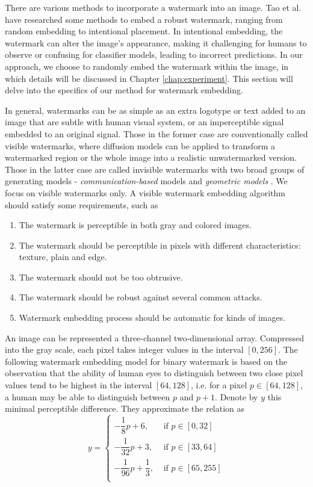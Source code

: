 There are various methods to incorporate a watermark into an image. Tao et al. \cite{tao2014robust} have researched some methods to embed a robust watermark, ranging from random embedding to intentional placement. In intentional embedding, the watermark can alter the image's appearance, making it challenging for humans to observe or confusing for classifier models, leading to incorrect predictions. In our approach, we choose to randomly embed the watermark within the image, in which details will be discussed in Chapter \ref{chap:experiment}. This section will delve into the specifics of our method for watermark embedding.


In general, watermarks can be as simple as an extra logotype or text added to an image that are subtle with human visual system, or an imperceptible signal embedded to an original signal. Those in the former case are conventionally called visible watermarks, where diffusion models can be applied to transform a watermarked region or the whole image into a realistic unwatermarked version. Those in the latter case are called invisible watermarks with two broad groups of generating models - \textit{communication-based} models and \textit{geometric models} \cite{cox2007digital}. We focus on visible watermarks only. A visible watermark embedding algorithm should satisfy some requirements, such as

\begin{enumerate}
    \item The watermark is perceptible in both gray and colored images.
    \item The watermark should be perceptible in pixels with different characteristics: texture, plain and edge.
    \item The watermark should not be too obtrusive.
    \item The watermark should be robust against several common attacks.
    \item Watermark embedding process should be automatic for kinds of images.
\end{enumerate}

An image can be represented a three-channel two-dimensional array. Compressed into the gray scale, each pixel takes integer values in the interval $[0,256]$.  The following watermark embedding model for binary watermark \cite{yu2013new} is based on the observation that the ability of human eyes to distinguish between two close pixel values tend to be highest in the interval $[64,128]$, i.e. for a pixel $p\in [64,128]$, a human may be able to distinguish between $p$ and $p+1$. Denote by $y$ this minimal perceptible difference. They approximate the relation as
\begin{equation}
    y=\begin{cases}
        -\dfrac{1}{8}p+6,             & \text{ if } p\in [0, 32]   \\
        -\dfrac{1}{32}p+3,            & \text{ if } p\in [33, 64]  \\
        -\dfrac{1}{96}p+\dfrac{1}{3}, & \text{ if } p\in [65, 255] \\
    \end{cases}
\end{equation}

